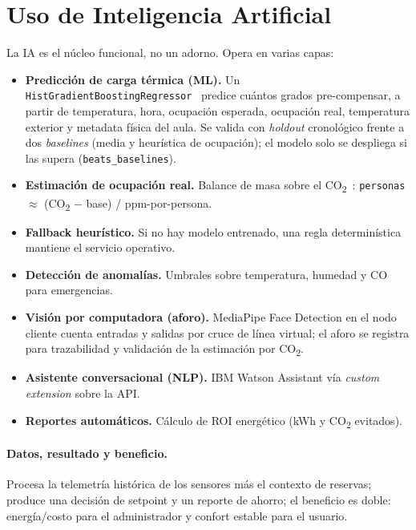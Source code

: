 \documentclass[11pt,a4paper]{article}
\begin{document}
\section{Uso de Inteligencia Artificial}

La IA es el núcleo funcional, no un adorno. Opera en varias capas:

\begin{itemize}
\item \textbf{Predicción de carga térmica (ML).} Un
\texttt{HistGradientBoostingRegressor}~\cite{sklearn} predice cuántos grados
pre-compensar, a partir de temperatura, hora, ocupación esperada, ocupación
real, temperatura exterior y metadata física del aula. Se valida con
\emph{holdout} cronológico frente a dos \emph{baselines} (media y heurística de
ocupación); el modelo solo se despliega si las supera
(\texttt{beats\_baselines}).
\item \textbf{Estimación de ocupación real.} Balance de masa sobre el
CO\textsubscript{2}~\cite{co2occupancy}: \texttt{personas} $\approx$
(CO\textsubscript{2} $-$ base) / ppm-por-persona.
\item \textbf{Fallback heurístico.} Si no hay modelo entrenado, una regla
determinística mantiene el servicio operativo.
\item \textbf{Detección de anomalías.} Umbrales sobre temperatura, humedad y CO
para emergencias.
\item \textbf{Visión por computadora (aforo).} MediaPipe Face Detection en el
nodo cliente cuenta entradas y salidas por cruce de línea virtual; el aforo se
registra para trazabilidad y validación de la estimación por CO\textsubscript{2}.
\item \textbf{Asistente conversacional (NLP).} IBM Watson Assistant vía
\emph{custom extension} sobre la API.
\item \textbf{Reportes automáticos.} Cálculo de ROI energético (kWh y CO\textsubscript{2} evitados).
\end{itemize}

\paragraph{Datos, resultado y beneficio.} Procesa la telemetría histórica de los
sensores más el contexto de reservas; produce una decisión de setpoint y un
reporte de ahorro; el beneficio es doble: energía/costo para el administrador y
confort estable para el usuario.
\end{document}
